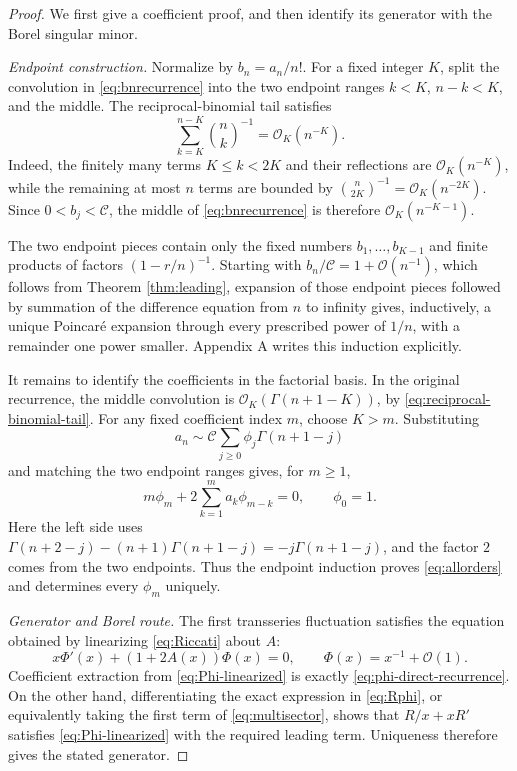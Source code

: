 \documentclass[11pt,a4paper]{article}
\theoremstyle{definition}
\theoremstyle{remark}
\newcommand{\bigO}{\mathcal{O}}
\newcommand{\constC}{\mathcal{C}}
\begin{document}
\begin{proof}
We first give a coefficient proof, and then identify its generator with the Borel singular minor.

\textit{Endpoint construction.}
Normalize by \(b_n=a_n/n!\).  For a fixed integer \(K\), split the convolution in \eqref{eq:bnrecurrence} into the two endpoint ranges \(k<K\), \(n-k<K\), and the middle.  The reciprocal-binomial tail satisfies
\begin{equation}\label{eq:reciprocal-binomial-tail}
 \sum_{k=K}^{n-K}\binom{n}{k}^{-1}=\bigO_K(n^{-K}).
\end{equation}
Indeed, the finitely many terms \(K\le k<2K\) and their reflections are \(\bigO_K(n^{-K})\), while the remaining at most \(n\) terms are bounded by \(\binom{n}{2K}^{-1}=\bigO_K(n^{-2K})\).  Since \(0<b_j<\constC\), the middle of \eqref{eq:bnrecurrence} is therefore \(\bigO_K(n^{-K-1})\).

The two endpoint pieces contain only the fixed numbers \(b_1,\ldots,b_{K-1}\) and finite products of factors \((1-r/n)^{-1}\).  Starting with \(b_n/\constC=1+\bigO(n^{-1})\), which follows from Theorem \ref{thm:leading}, expansion of those endpoint pieces followed by summation of the difference equation from \(n\) to infinity gives, inductively, a unique Poincar\'e expansion through every prescribed power of \(1/n\), with a remainder one power smaller.  Appendix A writes this induction explicitly.

It remains to identify the coefficients in the factorial basis.  In the original recurrence, the middle convolution is \(\bigO_K(\Gamma(n+1-K))\), by \eqref{eq:reciprocal-binomial-tail}.  For any fixed coefficient index \(m\), choose \(K>m\).  Substituting
\[
 a_n\sim\constC\sum_{j\ge0}\phi_j\Gamma(n+1-j)
\]
and matching the two endpoint ranges gives, for \(m\ge1\),
\begin{equation}\label{eq:phi-direct-recurrence}
 m\phi_m+2\sum_{k=1}^{m}a_k\phi_{m-k}=0,
 \qquad \phi_0=1.
\end{equation}
Here the left side uses
\(\Gamma(n+2-j)-(n+1)\Gamma(n+1-j)=-j\Gamma(n+1-j)\),
and the factor \(2\) comes from the two endpoints.  Thus the endpoint induction proves \eqref{eq:allorders} and determines every \(\phi_m\) uniquely.

\textit{Generator and Borel route.}
The first transseries fluctuation satisfies the equation obtained by linearizing \eqref{eq:Riccati} about \(A\):
\begin{equation}\label{eq:Phi-linearized}
 x\Phi'(x)+(1+2A(x))\Phi(x)=0,
 \qquad \Phi(x)=x^{-1}+\bigO(1).
\end{equation}
Coefficient extraction from \eqref{eq:Phi-linearized} is exactly \eqref{eq:phi-direct-recurrence}.  On the other hand, differentiating the exact expression in \eqref{eq:Rphi}, or equivalently taking the first term of \eqref{eq:multisector}, shows that \(R/x+xR'\) satisfies \eqref{eq:Phi-linearized} with the required leading term.  Uniqueness therefore gives the stated generator.


\end{proof}
\end{document}
